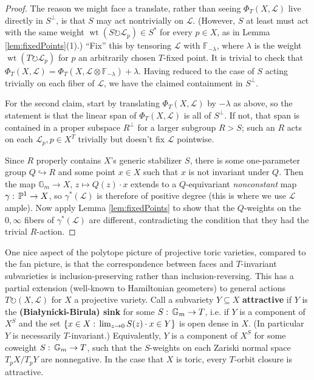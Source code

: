 \documentclass[10pt,a4paper]{amsart}
\DeclareMathOperator{\wt}{wt}
\newcommand{\PP}{\mathbb{P}}
\newcommand\defn[1]{{\bf #1}}
\newcommand\FF{{\mathbb F}}
\newcommand\tensor\otimes
\newcommand\calL{{\mathcal L}}
\newcommand\Gm{{\mathbb G}_m}
\newcommand\into\hookrightarrow
\newcommand\actson\circlearrowright
\renewcommand{\colon}{\mathrel{:}}
\renewcommand{\colon}{:\mkern\thinmuskip}
\begin{document}
\begin{proof}
  The reason we might face a translate,
  rather than seeing $\Phi_T(X,\calL)$ live directly in $S^\perp$,  
  is that $S$ may act nontrivially on $\calL$. (However, $S$ at least
  must act with the same weight $\wt(S \actson \calL_p) \in S^*$ for
  every $p\in X$, as in Lemma \ref{lem:fixedPoints}(1).)
  ``Fix'' this by tensoring $\calL$ with $\FF_{-\lambda}$,
  where $\lambda$ is the weight $\wt(T\actson \calL_p)$ for $p$ an
  arbitrarily chosen $T$-fixed point.  It is trivial to check that
  $\Phi_T(X,\calL) = \Phi_T(X,\calL\tensor \FF_{-\lambda}) + \lambda$.
  Having reduced to the case of $S$ acting trivially on each fiber of $\calL$,
  we have the claimed containment in $S^\perp$.

  For the second claim, start by translating $\Phi_T(X,\calL)$ by $-\lambda$
  as above, so the statement is that the linear span of $\Phi_T(X,\calL)$
  is all of $S^\perp$. If not, that span is contained in a proper
  subspace $R^\perp$ for a larger subgroup $R > S$; such an $R$ acts on
  each $\calL_p, p\in X^T$ trivially but doesn't fix $\calL$ pointwise.

  Since $R$ properly contains $X$'s generic stabilizer $S$, there is
  some one-parameter group $Q \into R$ and some point $x\in X$ such
  that $x$ is not invariant under $Q$. Then the map
  $\Gm \to X$, $z\mapsto Q(z)\cdot x$ extends to a $Q$-equivariant
  {\em nonconstant} map
  $\gamma\colon \PP^1 \to X$, so $\gamma^*(\calL)$ is therefore
  of positive degree (this is where we use $\calL$ ample).
  Now apply Lemma \ref{lem:fixedPoints} to show that the $Q$-weights on
  the $0,\infty$ fibers of $\gamma^*(\calL)$ are different, contradicting
  the condition that they had the trivial $R$-action.
\end{proof}

One nice aspect of the polytope picture of projective toric varieties,
compared to the fan picture, is that the correspondence between faces and
$T$-invariant subvarieties is inclusion-preserving rather than
inclusion-reversing. This has a partial extension (well-known to 
Hamiltonian geometers) to general actions
$T \actson (X,\calL)$ for $X$ a projective variety.
Call a subvariety $Y\subseteq X$ \defn{attractive}
if $Y$ is the \defn{(Bia\l ynicki-Birula) sink} for some $S\colon \Gm\to T$,
i.e. if $Y$ is a component of $X^S$ and the set
$ \{x\in X\colon \lim_{z\to 0} S(z)\cdot x \in Y\} $ is open dense in $X$.
(In particular $Y$ is necessarily $T$-invariant.)
Equivalently, $Y$ is a component of $X^S$ for some coweight
$S\colon \Gm\to T$, such that the $S$-weights
on each Zariski normal space $T_p X/T_pY$ are nonnegative.
In the case that $X$ is toric, every $T$-orbit closure is attractive.
\end{document}
